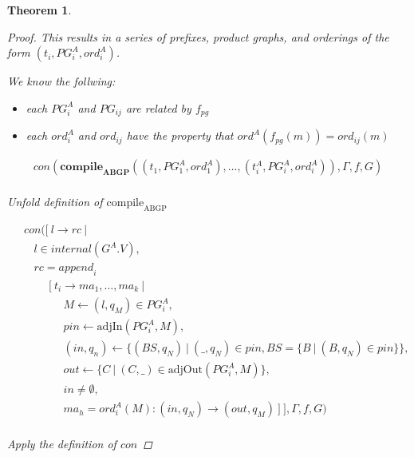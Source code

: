 \documentclass[twocolumn, openany]{sig-alternate-10pt}
\newtheorem{thm}{Theorem}
\begin{document}
\begin{thm}
\begin{proof}
    This results in a series of prefixes, product graphs, and orderings of the form $(t_i, PG^A_i, ord^A_i)$.

    We know the follwing:

    \begin{itemize}
      \item each $PG^A_i$ and $PG_{ij}$ are related by $f_{pg}$
      \vspace{-.2em}
      \item each $ord^A_i$ and $ord_{ij}$ have the property that $ord^A(f_{pg}(m)) = ord_{ij}(m)$
    \end{itemize}
    


  \[ \begin{array}{l}
     con(\textbf{compile}_\textbf{ABGP}( (t_1,PG^A_1,ord^A_1), \dots, (t^A_i,PG^A_i,ord^A_i) ), \Gamma,f,G) \\
  \end{array} \]%

Unfold definition of $\text{compile}_\text{ABGP}$

  \[ \begin{array}{l}
     ~~~~~ con([~ l \rightarrow rc ~\vert~ \\
     ~~~~~~~~~ l \in internal(G^A.V), \\
     ~~~~~~~~~ rc = \mathit{append}_i~  \\
     ~~~~~~~~~~~~~~~ [~ t_i \rightarrow ma_1, \dots, ma_k ~\vert~ \\
     ~~~~~~~~~~~~~~~~~~~~~ M \leftarrow (l,q_M) \in PG^A_i, \\
     ~~~~~~~~~~~~~~~~~~~~~ pin \leftarrow \text{adjIn}(PG^A_i,M), \\
     ~~~~~~~~~~~~~~~~~~~~~ (in,q_n) \leftarrow \{ (BS,q_N) ~\vert~ (\_,q_N) \in pin, BS=\{B ~\vert~ (B,q_N) \in pin \} \}, \\
     ~~~~~~~~~~~~~~~~~~~~~ out \leftarrow \{ C ~\vert~ (C,\_) \in \text{adjOut}(PG^A_i,M) \}, \\
     ~~~~~~~~~~~~~~~~~~~~~ in \neq \emptyset, \\
     ~~~~~~~~~~~~~~~~~~~~~ ma_h = ord^A_i(M) : (in,q_N) \rightarrow (out,q_M) ~] ~], \Gamma,f,G) \\
  \end{array} \]%

  Apply the definition of $con$


\end{proof}
\end{thm}
\end{document}
